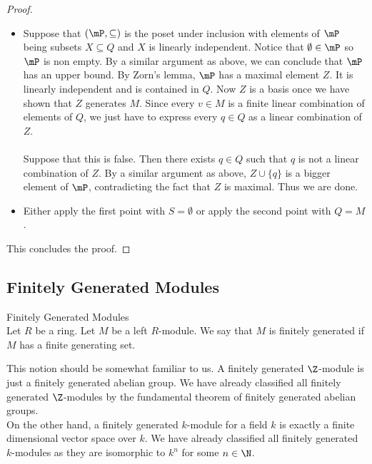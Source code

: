 \documentclass[a4paper]{article}
\begin{document}
\begin{prp}{}{}
\begin{proof}
\begin{itemize}
\item Suppose that $(\mP,\subseteq)$ is the poset under inclusion with elements of $\mP$ being subsets $X\subseteq Q$ and $X$ is linearly independent. Notice that $\emptyset\in\mP$ so $\mP$ is non empty. By a similar argument as above, we can conclude that $\mP$ has an upper bound. By Zorn's lemma, $\mP$ has a maximal element $Z$. It is linearly independent and is contained in $Q$. Now $Z$ is a basis once we have shown that $Z$ generates $M$. Since every $v\in M$ is a finite linear combination of elements of $Q$, we just have to express every $q\in Q$ as a linear combination of $Z$. \\~\\

Suppose that this is false. Then there exists $q\in Q$ such that $q$ is not a linear combination of $Z$. By a similar argument as above, $Z\cup\{q\}$ is a bigger element of $\mP$, contradicting the fact that $Z$ is maximal. Thus we are done. 

\item Either apply the first point with $S=\emptyset$ or apply the second point with $Q=M$. 
\end{itemize}
This concludes the proof. 
\end{proof}
\end{prp}

\subsection{Finitely Generated Modules}
\begin{defn}{Finitely Generated Modules}{}\\
Let $R$ be a ring. Let $M$ be a left $R$-module. We say that $M$ is finitely generated if $M$ has a finite generating set. 
\end{defn}

This notion should be somewhat familiar to us. A finitely generated $\Z$-module is just a finitely generated abelian group. We have already classified all finitely generated $\Z$-modules by the fundamental theorem of finitely generated abelian groups. \\

On the other hand, a finitely generated $k$-module for a field $k$ is exactly a finite dimensional vector space over $k$. We have already classified all finitely generated $k$-modules as they are isomorphic to $k^n$ for some $n\in\N$. 
\end{document}
